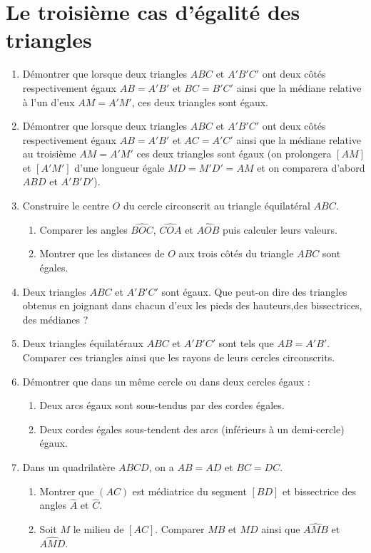 \documentclass[12 pt]{report}
\theoremstyle{plain}
\newcounter{n}
\begin{document}
\chapter{Le troisième cas d'égalité des triangles}
\begin{enumerate}
\item Démontrer que lorsque deux triangles $ABC$ et $A'B'C'$ ont deux côtés respectivement égaux $AB=A'B'$ et $BC=B'C'$ ainsi que la médiane relative à l'un d'eux $AM = A'M'$, ces deux triangles sont égaux.
\item Démontrer que lorsque deux triangles $ABC$ et $A'B'C'$ ont deux côtés 
respectivement égaux $AB=A'B'$ et $AC=A'C'$ ainsi que la médiane relative au troisième 
$AM=A'M'$ ces deux triangles sont égaux (on prolongera $[AM]$ et $[A'M']$ d'une longueur égale $MD=M'D'=AM$ et on comparera d'abord $ABD$ et $A'B'D'$). 
\item Construire le centre $O$ du cercle circonscrit au triangle équilatéral $ABC$. 
\begin{enumerate}
\item Comparer les angles $\widehat{BOC}$, $\widehat{COA}$ et $\widehat{AOB}$ puis calculer leurs valeurs.
\item Montrer que les distances de $O$ aux trois côtés du triangle $ABC$ sont égales.
\end{enumerate}
\item Deux triangles $ABC$ et $A'B'C'$ sont égaux. Que peut-on dire des triangles obtenus en joignant dans chacun d'eux les pieds des hauteurs,des bissectrices, des médianes ?
\item Deux triangles équilatéraux $ABC$ et $A'B'C'$ sont tels que $AB=A'B'$. Comparer ces triangles ainsi que les rayons de leurs cercles circonscrits. 
\item Démontrer que dans un même cercle ou dans deux cercles égaux : \begin{enumerate}
\item Deux arcs égaux sont sous-tendus par des cordes égales. 
\item Deux cordes égales sous-tendent des arcs (inférieurs à un demi-cercle) égaux.
\end{enumerate}
\item Dans un quadrilatère $ABCD$, on a $AB=AD$ et $BC=DC$. 
\begin{enumerate}
\item Montrer que $(AC)$ est médiatrice du segment $[BD]$ et bissectrice des angles $\widehat{A}$ et $\widehat{C}$.
\item Soit $M$ le milieu de $[AC]$. Comparer $MB$ et $MD$ ainsi que $\widehat{AMB}$ et $\widehat{AMD}$.

\end{enumerate}
\end{enumerate}
\end{document}
